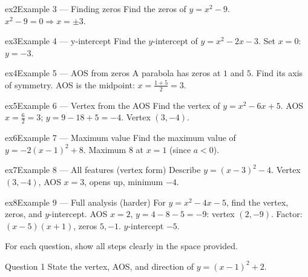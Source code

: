\documentclass[11pt]{article}
\begin{document}
\begin{example}{ex2}{Example 3 --- Finding zeros}
Find the zeros of $y=x^2-9$.
\soln $x^2-9=0\Rightarrow x=\pm3.$
\end{example}

\begin{example}{ex3}{Example 4 --- y-intercept}
Find the $y$-intercept of $y=x^2-2x-3$.
\soln Set $x=0$: $y=-3.$
\end{example}

\begin{example}{ex4}{Example 5 --- AOS from zeros}
A parabola has zeros at $1$ and $5$. Find its axis of symmetry.
\soln AOS is the midpoint: $x=\tfrac{1+5}{2}=3.$
\end{example}

\begin{example}{ex5}{Example 6 --- Vertex from the AOS}
Find the vertex of $y=x^2-6x+5$.
\soln AOS $x=\tfrac{6}{2}=3$; $y=9-18+5=-4$. Vertex $(3,-4)$.
\end{example}

\begin{example}{ex6}{Example 7 --- Maximum value}
Find the maximum value of $y=-2(x-1)^2+8$.
\soln Maximum $8$ at $x=1$ (since $a<0$).
\end{example}

\begin{example}{ex7}{Example 8 --- All features (vertex form)}
Describe $y=(x-3)^2-4$.
\soln Vertex $(3,-4)$, AOS $x=3$, opens up, minimum $-4$.
\end{example}

\begin{example}{ex8}{Example 9 --- Full analysis (harder)}
For $y=x^2-4x-5$, find the vertex, zeros, and $y$-intercept.
\soln AOS $x=2$, $y=4-8-5=-9$: vertex $(2,-9)$. Factor: $(x-5)(x+1)$, zeros $5,-1$. $y$-intercept $-5$.
\end{example}

\clearpage
{}
For each question, show all steps clearly in the space provided.

\begin{qbox}{Question 1}
State the vertex, AOS, and direction of $y=(x-1)^2+2$.\workspace{2.0cm}
\end{qbox}
\end{document}
